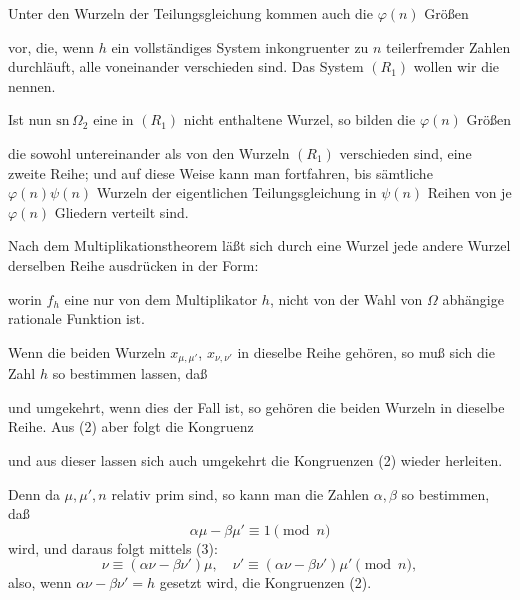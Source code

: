 Unter den Wurzeln der Teilungsgleichung kommen auch die
$\varphi(n)$ Größen

vor, die, wenn $h$ ein vollständiges System inkongruenter zu
$n$ teilerfremder Zahlen durchläuft, alle voneinander verschieden
sind. Das System $(R_1)$ wollen wir die 
nennen.

Ist nun $\mathrm{sn}\,\Omega_2$ eine in $(R_1)$ nicht enthaltene Wurzel, so bilden
die $\varphi(n)$ Größen

die sowohl untereinander als von den Wurzeln $(R_1)$ verschieden
sind, eine zweite Reihe; und auf diese Weise kann man fortfahren,
bis sämtliche $\varphi(n)\psi(n)$ Wurzeln der eigentlichen Teilungsgleichung
in $\psi(n)$ Reihen von je $\varphi(n)$ Gliedern verteilt sind.

Nach dem Multiplikationstheorem läßt sich durch eine Wurzel
jede andere Wurzel derselben Reihe  ausdrücken in der
Form:

worin $f_h$ eine nur von dem Multiplikator $h$, nicht von der Wahl
von $\Omega$ abhängige rationale Funktion ist.

Wenn die beiden Wurzeln $x_{\mu,\mu'}$, $x_{\nu,\nu'}$ in dieselbe Reihe gehören, so muß sich die Zahl $h$ so bestimmen lassen, daß

und umgekehrt, wenn dies der Fall ist, so gehören die beiden
Wurzeln in dieselbe Reihe. Aus (2) aber folgt die Kongruenz

und aus dieser lassen sich auch umgekehrt die Kongruenzen (2)
wieder herleiten.

Denn da $\mu, \mu', n$ relativ prim sind, so kann man die Zahlen
$\alpha, \beta$ so bestimmen, daß
\[
\alpha\mu - \beta\mu' \equiv 1 \pmod{n}
\]
wird, und daraus folgt mittels (3):
\[
\nu \equiv (\alpha\nu - \beta\nu')\mu, \quad \nu' \equiv (\alpha\nu - \beta\nu')\mu' \pmod{n},
\]
also, wenn $\alpha\nu - \beta\nu' = h$ gesetzt wird, die Kongruenzen (2).

